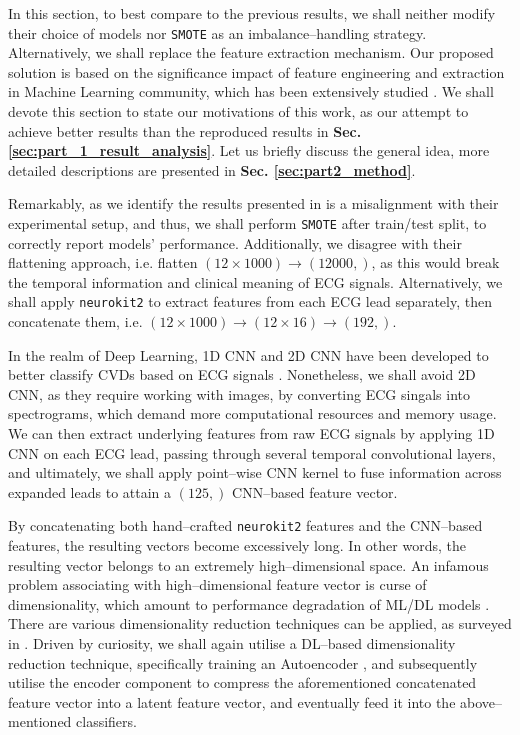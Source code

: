 In this section, to best compare to the previous results, we shall neither modify their choice of models nor \texttt{SMOTE} as an imbalance–handling strategy.
Alternatively, we shall replace the feature extraction mechanism. Our proposed solution is based on the significance impact of feature engineering and extraction in Machine Learning community, which has been extensively studied \cite{pmlr-v44-storcheus2015survey, zheng2018feature, sonnadara2026interpretable, MUMUNI2025113}.
We shall devote this section to state our motivations of this work, as our attempt to achieve better results
than the reproduced results in \textbf{Sec. \ref{sec:part_1_result_analysis}}.
Let us briefly discuss the general idea, more detailed descriptions are presented in \textbf{Sec. \ref{sec:part2_method}}.


Remarkably, as we identify the results presented in \cite{sinha2023dasmcc} is a misalignment with their experimental setup, and thus,
we shall perform \texttt{SMOTE} after train/test split, to correctly report models' performance.
Additionally, we disagree with their flattening approach, i.e. flatten $(12 \times 1000) \rightarrow (12000,)$, as this would break the temporal information and clinical meaning of ECG signals. 
Alternatively, we shall apply \texttt{neurokit2} to extract features from each ECG lead separately, then concatenate them, i.e. $(12 \times 1000) \rightarrow (12 \times 16) \rightarrow (192,)$.


In the realm of Deep Learning, 1D CNN and 2D CNN have been developed to better classify CVDs based on ECG signals \cite{Wu2018ACO, NAROTAMO2024106141, DCNN4ECG}.
Nonetheless, we shall avoid 2D CNN, as they require working with images, by converting ECG singals into spectrograms, which demand more computational resources and memory usage.
We can then extract underlying features from raw ECG signals by applying 1D CNN on each ECG lead, passing through several temporal convolutional layers, and ultimately, we shall apply point–wise CNN kernel to fuse information across expanded leads to attain a $(125,)$ CNN–based feature vector.

By concatenating both hand–crafted \texttt{neurokit2} features and the CNN–based features, the resulting vectors become excessively long.
In other words, the resulting vector belongs to an extremely high–dimensional space. An infamous problem associating with high–dimensional feature vector is curse of dimensionality,
which amount to performance degradation of ML/DL models \cite{dimreductreview, peng2025interpretingcursedimensionalitydistance,jia2022feature}.
There are various dimensionality reduction techniques can be applied, as surveyed in \cite{dimreductreview,jia2022feature}.
Driven by curiosity, we shall again utilise a DL–based dimensionality reduction technique, specifically training an Autoencoder \cite{berahmand2024autoencoders}, and subsequently utilise the encoder component to compress the aforementioned concatenated feature vector into a latent feature vector, and eventually feed it into the above–mentioned classifiers.
